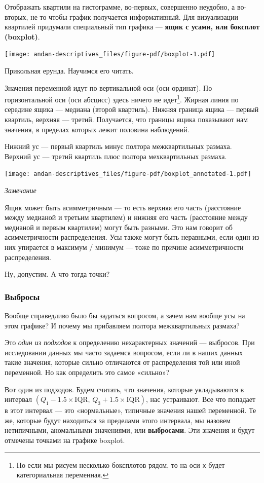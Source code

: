 \documentclass[
  letterpaper,
  DIV=11,
  numbers=noendperiod]{scrreprt}
\theoremstyle{definition}
\theoremstyle{remark}
\begin{document}
Отображать квартили на гистограмме, во-первых, совершенно неудобно, а
во-вторых, не то чтобы график получается информативный. Для визуализации
квартилей придумали специальный тип графика --- \textbf{ящик с усами,
или боксплот (boxplot)}.

\texttt{[image: andan-descriptives\_files/figure-pdf/boxplot-1.pdf]}

Прикольная ерунда. Научимся его читать.

Значения переменной идут по вертикальной оси (оси ординат). По
горизонтальной оси (оси абсцисс) здесь ничего не идет\footnote{Но если
  мы рисуем несколько боксплотов рядом, то на оси \texttt{x} будет
  категориальная переменная.}. Жирная линия по середине ящика ---
медиана (второй квартиль). Нижняя граница ящика --- первый квартиль,
верхняя --- третий. Получается, что границы ящика показывают нам
значения, в пределах которых лежит половина наблюдений.

Нижний ус --- первый квартиль минус полтора межквартильных размаха.
Верхний ус --- третий квартиль плюс полтора мехквартильных размаха.

\texttt{[image: andan-descriptives\_files/figure-pdf/boxplot\_annotated-1.pdf]}

\emph{Замечание}

Ящик может быть асимметричным --- то есть верхняя его часть (расстояние
между медианой и третьим квартилем) и нижняя его часть (расстояние между
медианой и первым квартилем) могут быть разными. Это нам говорит об
асимметричности распределения. Усы также могут быть неравными, если один
из них упирается в максимум / минимум --- тоже по причине
асимметричности распределения.

Ну, допустим. А что тогда точки?

\subsubsection{Выбросы}\label{andan-descriptives-XX-iqr_outliers}

Вообще справедливо было бы задаться вопросом, а зачем нам вообще усы на
этом графике? И почему мы прибавляем полтора межквартильных размаха?

Это \emph{один из подходов} к определению нехарактерных значений ---
выбросов. При исследовании данных мы часто задаемся вопросом, если ли в
наших данных такие значения, которые сильно отличаются от распределения
той или иной переменной. Но как определить это самое «сильно»?

Вот один из подходов. Будем считать, что значения, которые укладываются
в интервал
\((Q_1 - 1.5 \times \mathrm{IQR}, \, Q_3 + 1.5 \times \mathrm{IQR})\),
нас устраивают. Все что попадает в этот интервал --- это «нормальные»,
типичные значения нашей переменной. Те же, которые будут находиться за
пределами этого интервала, мы назовем нетипичными, аномальными
значениями, или \textbf{выбросами}. Эти значения и будут отмечены
точками на графике boxplot.
\end{document}
